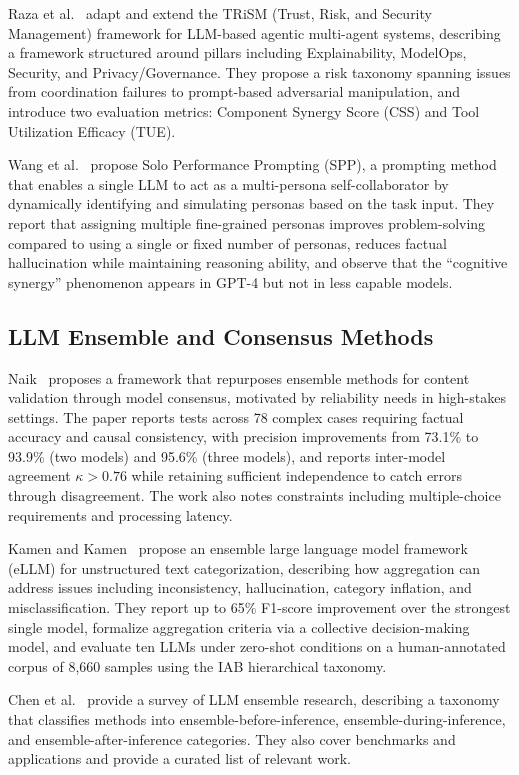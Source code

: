 \documentclass[sigconf]{acmart}
\begin{document}
Raza et al.~\cite{Raza2025TRiSM} adapt and extend the TRiSM (Trust, Risk, and Security Management) framework for LLM-based agentic multi-agent systems, describing a framework structured around pillars including Explainability, ModelOps, Security, and Privacy/Governance. They propose a risk taxonomy spanning issues from coordination failures to prompt-based adversarial manipulation, and introduce two evaluation metrics: Component Synergy Score (CSS) and Tool Utilization Efficacy (TUE).

Wang et al.~\cite{Wang2024MultiPersona} propose Solo Performance Prompting (SPP), a prompting method that enables a single LLM to act as a multi-persona self-collaborator by dynamically identifying and simulating personas based on the task input. They report that assigning multiple fine-grained personas improves problem-solving compared to using a single or fixed number of personas, reduces factual hallucination while maintaining reasoning ability, and observe that the ``cognitive synergy'' phenomenon appears in GPT-4 but not in less capable models.

\subsection{LLM Ensemble and Consensus Methods}

Naik~\cite{Naik2024} proposes a framework that repurposes ensemble methods for content validation through model consensus, motivated by reliability needs in high-stakes settings. The paper reports tests across 78 complex cases requiring factual accuracy and causal consistency, with precision improvements from 73.1\% to 93.9\% (two models) and 95.6\% (three models), and reports inter-model agreement $\kappa > 0.76$ while retaining sufficient independence to catch errors through disagreement. The work also notes constraints including multiple-choice requirements and processing latency.

Kamen and Kamen~\cite{Kamen2025} propose an ensemble large language model framework (eLLM) for unstructured text categorization, describing how aggregation can address issues including inconsistency, hallucination, category inflation, and misclassification. They report up to 65\% F1-score improvement over the strongest single model, formalize aggregation criteria via a collective decision-making model, and evaluate ten LLMs under zero-shot conditions on a human-annotated corpus of 8,660 samples using the IAB hierarchical taxonomy.

Chen et al.~\cite{Chen2025LLMEnsemble} provide a survey of LLM ensemble research, describing a taxonomy that classifies methods into ensemble-before-inference, ensemble-during-inference, and ensemble-after-inference categories. They also cover benchmarks and applications and provide a curated list of relevant work.
\end{document}
